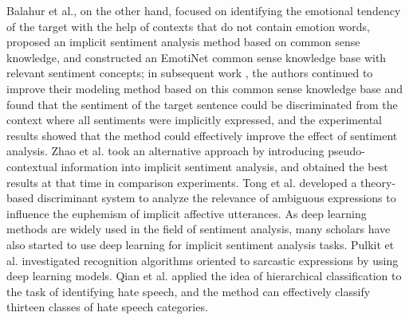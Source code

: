 Balahur et al.\cite{balahur2011detecting}, on the other hand, focused on identifying the emotional tendency of the target with the help of contexts that do not contain emotion words, proposed an implicit sentiment analysis method based on common sense knowledge, and constructed an EmotiNet common sense knowledge base with relevant sentiment concepts; in subsequent work \cite{ balahur2012detecting}, the authors continued to improve their modeling method based on this common sense knowledge base and found that the sentiment of the target sentence could be discriminated from the context where all sentiments were implicitly expressed, and the experimental results showed that the method could effectively improve the effect of sentiment analysis.
Zhao et al.\cite{zhao2012collocation} took an alternative approach by introducing pseudo-contextual information into implicit sentiment analysis, and obtained the best results at that time in comparison experiments.
Tong et al. \cite{tong2013can} developed a theory-based discriminant system to analyze the relevance of ambiguous expressions to influence the euphemism of implicit affective utterances.
As deep learning methods are widely used in the field of sentiment analysis, many scholars have also started to use deep learning for implicit sentiment analysis tasks. Pulkit et al.\cite{mehndiratta2017detection} investigated recognition algorithms oriented to sarcastic expressions by using deep learning models. Qian et al.\cite{qian2018hierarchical} applied the idea of hierarchical classification to the task of identifying hate speech, and the method can effectively classify thirteen classes of hate speech categories.


